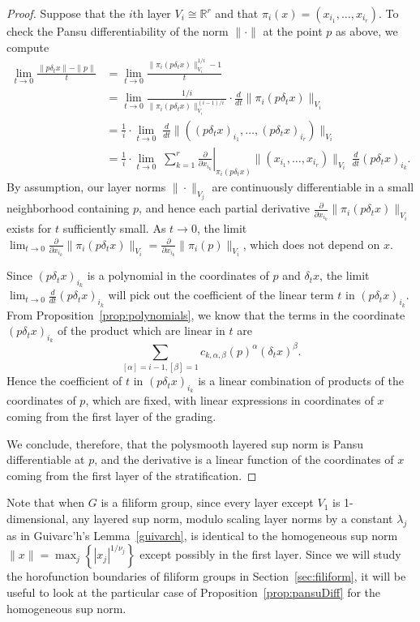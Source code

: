 \documentclass{article}
\theoremstyle{definition}
\newcommand{\ddt}{\frac{d}{dt}}
\newcommand{\norm}[1]{\|#1\|}
\newcommand{\R}{{\mathbb R}}
\begin{document}
\begin{proof}
Suppose that the $i$th layer $V_i \cong \R^r$ and that $\pi_i(x) = (x_{i_1},\ldots, x_{i_r})$. To check the Pansu differentiability of the norm $\norm{\cdot}$ at the point $p$ as above, we compute
\begin{align*}
\lim_{t\to 0}\frac{\norm{p\delta_t x} - \norm{p}}{t}  &= \lim_{t\to0} \frac{\norm{\pi_i(p\delta_t x)}_{V_i}^{1/i}-1}{t}\\
&= \lim_{t\to0} \frac{1 /i}{\norm{\pi_i(p\delta_t x)}_{V_i}^{(i-1)/i}}\cdot \ddt \norm{\pi_i(p\delta_t x)}_{V_i}\\
&=  \frac{1}{i}\cdot \lim_{t\to0} \;\ddt \norm{((p\delta_tx)_{i_1},\ldots, (p\delta_tx)_{i_r})}_{V_i}\\
&=  \frac{1}{i}\cdot \lim_{t\to0} \; \sum_{k=1}^{r} \left.\frac{\partial}{\partial x_{i_k}}\right\vert_{\pi_i(p\delta_tx)}\norm{(x_{i_1},\ldots,x_{i_r})}_{V_i} \:\ddt (p\delta_tx)_{i_k}.
\end{align*}
By assumption, our layer norms $\norm{\cdot}_{V_j}$ are continuously differentiable in a small neighborhood containing $p$, and hence each partial derivative $\frac{\partial}{\partial x_{i_k}}\norm{\pi_i(p\delta_t x)}_{V_i}$ exists for $t$ sufficiently small. As $t \to 0$,  the limit $\lim_{t\to 0} \frac{\partial}{\partial x_{i_k}}\norm{\pi_i(p\delta_t x)}_{V_i} = \frac{\partial}{\partial x_{i_k}}\norm{\pi_i(p)}_{V_i}$, which does not depend on $x$.

Since $(p\delta_tx)_{i_k}$ is a polynomial in the coordinates of $p$ and $\delta_tx$, the limit $\lim_{t\to 0}\ddt (p\delta_tx)_{i_k}$ will pick out the coefficient of the linear term $t$ in $(p\delta_t x)_{i_k}$. From Proposition~\ref{prop:polynomials}, we know that the terms in the coordinate $ (p\delta_tx)_{i_k}$ of the product which are linear in $t$ are
\[
\sum_{ [\alpha]=i-1, [\beta]=1} c_{k,\alpha,\beta}(p)^\alpha(\delta_tx)^\beta.
\]
Hence the coefficient of $t$ in $(p\delta_t x)_{i_k}$ is a linear combination of products of the coordinates of $p$, which are fixed, with linear expressions in coordinates of $x$ coming from the first layer of the grading.

We conclude, therefore, that the polysmooth layered sup norm is Pansu differentiable at $p$, and the derivative is a linear function of the coordinates of $x$ coming from the first layer of the stratification.

\end{proof}

Note that when $G$ is a filiform group, since every layer except $V_1$ is 1-dimensional, any layered sup norm, modulo scaling layer norms by a constant $\lambda_j$ as in Guivarc'h's Lemma~\ref{guivarch}, is identical to the homogeneous sup norm $\norm{x} = \max_j \left\{ |x_j|^{1/\nu_j}\right \}$ except possibly in the first layer. Since we will study the horofunction boundaries of filiform groups in Section~\ref{sec:filiform}, it will be useful to look at the particular case of Proposition~\ref{prop:pansuDiff} for the homogeneous sup norm.
\end{document}
